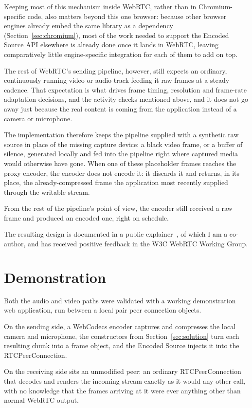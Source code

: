 \documentclass[11pt]{article}
\begin{document}
Keeping most of this mechanism inside WebRTC, rather than in Chromium-specific code, also matters beyond this one browser: because other browser engines already embed the same library as a dependency (Section~\ref{sec:chromium}), most of the work needed to support the Encoded Source API elsewhere is already done once it lands in WebRTC, leaving comparatively little engine-specific integration for each of them to add on top.

The rest of WebRTC's sending pipeline, however, still expects an ordinary, continuously running video or audio track feeding it raw frames at a steady cadence. That expectation is what drives frame timing, resolution and frame-rate adaptation decisions, and the activity checks mentioned above, and it does not go away just because the real content is coming from the application instead of a camera or microphone.

The implementation therefore keeps the pipeline supplied with a synthetic raw source in place of the missing capture device: a black video frame, or a buffer of silence, generated locally and fed into the pipeline right where captured media would otherwise have gone. When one of these placeholder frames reaches the proxy encoder, the encoder does not encode it: it discards it and returns, in its place, the already-compressed frame the application most recently supplied through the writable stream.

From the rest of the pipeline's point of view, the encoder still received a raw frame and produced an encoded one, right on schedule.

The resulting design is documented in a public explainer~\cite{explainer}, of which I am a co-author, and has received positive feedback in the W3C WebRTC Working Group.

\section{Demonstration}
\label{sec:demonstration}

Both the audio and video paths were validated with a working demonstration web application, run between a local pair peer connection objects.

On the sending side, a WebCodecs encoder captures and compresses the local camera and microphone, the constructors from Section~\ref{sec:solution} turn each resulting chunk into a frame object, and the Encoded Source injects it into the RTCPeerConnection.

On the receiving side sits an unmodified peer: an ordinary RTCPeerConnection that decodes and renders the incoming stream exactly as it would any other call, with no knowledge that the frames arriving at it were ever anything other than normal WebRTC output. 
\end{document}
